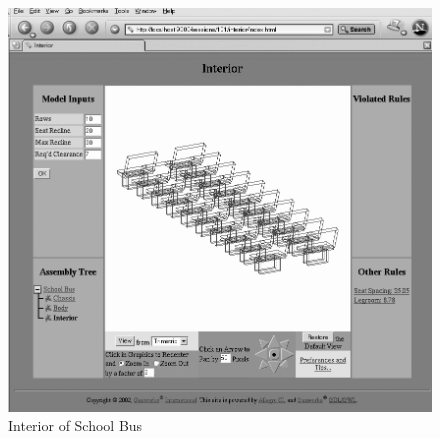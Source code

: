 \documentclass [11pt]{book}
\begin{document}
\begin{figure}
\begin{center}
\includegraphics{../images/school-bus-interior.png}
\end{center}

\caption{Interior of School Bus}

\label{fig:school-bus-interior}

\end{figure}
\end{document}
